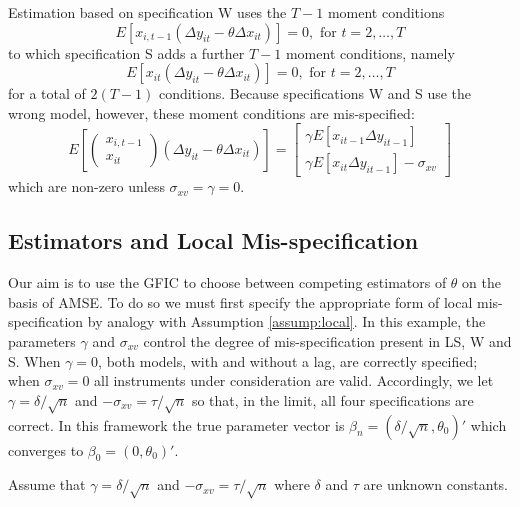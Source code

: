 Estimation based on specification W uses the $T-1$ moment conditions
\begin{equation}
E\left[x_{i,t-1} \left(\Delta y_{it} - \theta \Delta x_{it}\right)\right] = 0, \mbox{ for } t = 2, \hdots, T
\end{equation}
to which specification S adds a further $T-1$ moment conditions, namely
\begin{equation}
\label{eq:Sadd}
E\left[x_{it} \left(\Delta y_{it} - \theta \Delta x_{it}\right)\right] = 0, \mbox{ for } t = 2, \hdots, T
\end{equation}
for a total of $2(T - 1)$ conditions. Because specifications W and S use the wrong model, however, these moment conditions are mis-specified:
\begin{equation}
\label{eq:trueexpect}
E\left[\left(\begin{array}{c}x_{i,t-1}\\x_{it}\end{array}\right) \left(\Delta y_{it} - \theta \Delta x_{it}\right)\right] = \left[\begin{array}{c}\gamma E[x_{it-1}\Delta y_{it-1}]\\\gamma E[x_{it}\Delta y_{it-1}] - \sigma_{xv}\end{array} \right]
\end{equation}
which are non-zero unless $\sigma_{xv} = \gamma = 0$.



\subsection{Estimators and Local Mis-specification}

Our aim is to use the GFIC to choose between competing estimators of $\theta$ on the basis of AMSE. 
To do so we must first specify the appropriate form of local mis-specification by analogy with Assumption \ref{assump:local}.
In this example, the parameters $\gamma$ and $\sigma_{xv}$ control the degree of mis-specification present in LS, W and S. 
When $\gamma=0$, both models, with and without a lag, are correctly specified; when $\sigma_{xv}=0$ all instruments under consideration are valid. 
Accordingly, we let $\gamma = \delta/\sqrt{n}$ and $-\sigma_{xv} = \tau/\sqrt{n}$ so that, in the limit, all four specifications are correct. 
In this framework the true parameter vector is $\beta_n = \left(\delta/\sqrt{n}, \theta_0\right)'$ which converges to $\beta_0 = \left(0,\theta_0\right)'$. 

\begin{assump}
\label{assump:localex}
Assume that $\gamma = \delta/\sqrt{n}$ and $-\sigma_{xv} = \tau/\sqrt{n}$ where $\delta$ and $\tau$ are unknown constants.
\end{assump}

